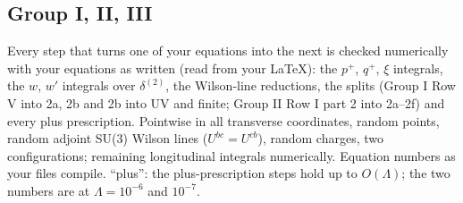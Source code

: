 \documentclass[10pt]{article}
\numberwithin{equation}{section}
\begin{document}
\subsection{Group I, II, III}
Every step that turns one of your equations into the next is checked numerically with your equations as written (read from your \LaTeX): the $p^+$, $q^+$, $\xi$ integrals, the $w$, $w'$ integrals over $\delta^{(2)}$, the Wilson-line reductions, the splits (Group I Row V into 2a, 2b and 2b into UV and finite; Group II Row I part 2 into 2a--2f) and every plus prescription. Pointwise in all transverse coordinates, random points, random adjoint SU(3) Wilson lines ($U^{bc}=U^{cb}$), random charges, two configurations; remaining longitudinal integrals numerically. Equation numbers as your files compile. ``plus'': the plus-prescription steps hold up to $O(\Lambda)$; the two numbers are at $\Lambda=10^{-6}$ and $10^{-7}$.
\end{document}
